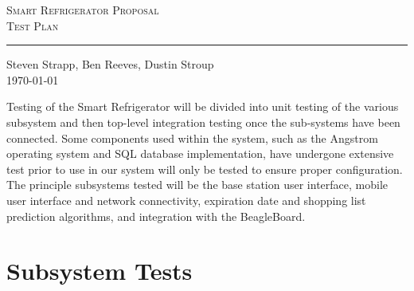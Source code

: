 \documentclass[11pt,letterpaper]{article}
\begin{document}
\begin{center}
\huge
\textsc{Smart Refrigerator Proposal}\\
\Large
\textsc{Test Plan} \\
\vspace{.20cm}
\hrule
\vspace{.40cm}
\normalsize
Steven Strapp, Ben Reeves, Dustin Stroup \\
\today \\
\vspace{1cm}
\end{center}
Testing of the Smart Refrigerator will be divided into unit testing of the various subsystem and then top-level integration testing once the sub-systems have been connected. Some components used within the system, such as the Angstrom operating system and SQL database implementation, have undergone extensive test prior to use in our system will only be tested to ensure proper configuration. The principle subsystems tested will be the base station user interface, mobile user interface and network connectivity, expiration date and shopping list prediction algorithms, and integration with the BeagleBoard.

\section{Subsystem Tests}
\end{document}
